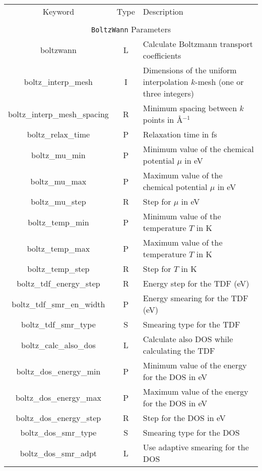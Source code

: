 \begin{table}[hH!]
\begin{center}
\begin{tabular}{|c|c|p{6cm}|}
\hline
Keyword & Type & Description \\
        &      &             \\
\hline\hline
\multicolumn{3}{|c|}{{\tt BoltzWann} Parameters} \\
\hline
{\sc boltzwann}   & L & Calculate Boltzmann transport coefficients \\
{\sc boltz\_interp\_mesh} & I & Dimensions of the uniform interpolation 
$k$-mesh (one or three integers)\\ 
{\sc boltz\_interp\_mesh\_spacing} & R & Minimum spacing between $k$ points in \AA$^{-1}$\\
{\sc boltz\_relax\_time} & P & Relaxation time in fs\\
{\sc boltz\_mu\_min} & P & Minimum value of the chemical potential $\mu$ in eV\\
{\sc boltz\_mu\_max} & P & Maximum value of the chemical potential $\mu$ in eV\\
{\sc boltz\_mu\_step} & R & Step for $\mu$ in eV\\
{\sc boltz\_temp\_min} & P & Minimum value of the temperature $T$ in K \\
{\sc boltz\_temp\_max} & P & Maximum value of the temperature $T$ in K \\
{\sc boltz\_temp\_step} & R & Step for $T$ in K \\
{\sc boltz\_tdf\_energy\_step} & R & Energy step for the TDF (eV) \\
{\sc boltz\_tdf\_smr\_en\_width} & P & Energy smearing for the TDF (eV) \\
{\sc boltz\_tdf\_smr\_type} & S & Smearing type for the TDF \\
{\sc boltz\_calc\_also\_dos} & L & Calculate also DOS while calculating the TDF\\
{\sc boltz\_dos\_energy\_min} & P & Minimum value of the energy for the DOS in eV \\
{\sc boltz\_dos\_energy\_max} & P & Maximum value of the energy for the DOS in eV \\
{\sc boltz\_dos\_energy\_step} & R & Step for the DOS in eV\\
{\sc boltz\_dos\_smr\_type} & S & Smearing type for the DOS \\
{\sc boltz\_dos\_smr\_adpt} & L & Use adaptive smearing for the DOS \\

\end{tabular}
\end{center}
\end{table}
